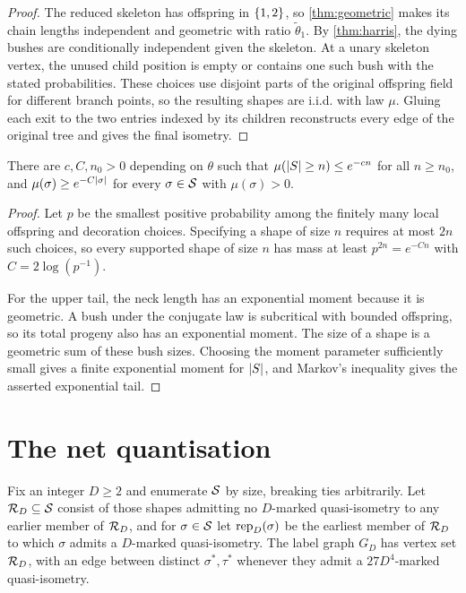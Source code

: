 \begin{proof}
\leanok
{}
The reduced skeleton has offspring in $\{1,2\}$, so \cref{thm:geometric} makes its chain
lengths independent and geometric with ratio $\widetilde\theta_1$. By
\cref{thm:harris}, the dying bushes are conditionally independent given the skeleton. At a unary
skeleton vertex, the unused child position is empty or contains one such bush with the stated
probabilities. These choices use disjoint parts of the original offspring field for different
branch points, so the resulting shapes are i.i.d. with law $\mu$. Gluing each exit to the two
entries indexed by its children reconstructs every edge of the original tree and gives the final
isometry.
\end{proof}

\begin{lemma}
\label{thm:shape-mass}
\leanok
There are $c,C,n_0>0$ depending on $\theta$ such that $\mu(\lvert S \rvert\geq n)\leq e^{-cn}$ for all
$n\geq n_0$, and $\mu(\sigma)\geq e^{-C\lvert \sigma \rvert}$ for every $\sigma\in\mathcal{S}$ with
$\mu(\sigma)>0$.
\end{lemma}

\begin{proof}
\leanok
{}
Let $p$ be the smallest positive probability among the finitely many local offspring and
decoration choices. Specifying a shape of size $n$ requires at most $2n$ such choices, so every
supported shape of size $n$ has mass at least $p^{2n}=e^{-C n}$ with
$C=2\log(p^{-1})$.

For the upper tail, the neck length has an exponential moment because it is geometric. A bush
under the conjugate law is subcritical with bounded offspring, so its total progeny also has an
exponential moment. The size of a shape is a geometric sum of these bush sizes. Choosing the
moment parameter sufficiently small gives a finite exponential moment for $\lvert S \rvert$, and Markov's
inequality gives the asserted exponential tail.
\end{proof}

\section{The net quantisation}

\begin{definition}
\label{def:shape-net}
\leanok
{}
Fix an integer $D\geq2$ and enumerate $\mathcal{S}$ by size, breaking ties arbitrarily. Let
$\mathcal{R}_D\subseteq\mathcal{S}$ consist of those shapes admitting no $D$-marked quasi-isometry to any
earlier member of $\mathcal{R}_D$, and for $\sigma\in\mathcal{S}$ let $\operatorname{rep}_D(\sigma)$ be the earliest member
of $\mathcal{R}_D$ to which $\sigma$ admits a $D$-marked quasi-isometry. The label graph $G_D$ has
vertex set $\mathcal{R}_D$, with an edge between distinct $\sigma^*,\tau^*$ whenever they admit a
$27D^4$-marked quasi-isometry.
\end{definition}

